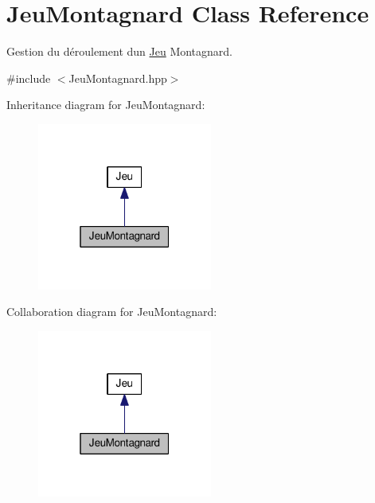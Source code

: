 \hypertarget{classJeuMontagnard}{}\section{Jeu\+Montagnard Class Reference}
\label{classJeuMontagnard}


Gestion du déroulement d\textquotesingle{}un \hyperlink{classJeu}{Jeu} Montagnard.  




{\ttfamily \#include $<$Jeu\+Montagnard.\+hpp$>$}



Inheritance diagram for Jeu\+Montagnard\+:
\nopagebreak
\begin{figure}[H]
\begin{center}
\leavevmode
\includegraphics[width=163pt]{classJeuMontagnard__inherit__graph}
\end{center}
\end{figure}


Collaboration diagram for Jeu\+Montagnard\+:
\nopagebreak
\begin{figure}[H]
\begin{center}
\leavevmode
\includegraphics[width=163pt]{classJeuMontagnard__coll__graph}
\end{center}
\end{figure}
